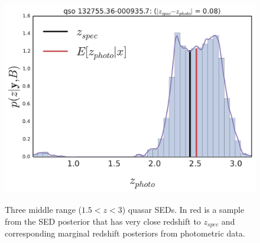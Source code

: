 \documentclass{article}
\begin{document}
\begin{figure}[t]
{\includegraphics[width=.56\columnwidth]{../../figs/quasar_plots/close_mid/quasar_1959_posterior_z}
}
\vskip -0.2in
\caption{ Three middle range ($1.5 < z < 3$) quasar SEDs.  In red is a sample from the SED posterior that has very close redshift to $z_{spec}$ and corresponding marginal redshift posteriors from photometric data. }
\label{fig:mid}
\vskip -0.2in
\end{figure}
\clearpage
\end{document}
